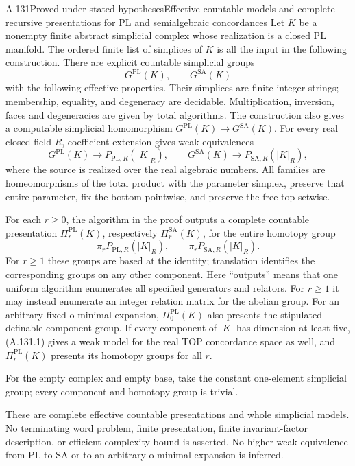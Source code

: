 \begin{saresult}{A.131}{Proved under stated hypotheses}{Effective countable models and complete recursive presentations for PL and semialgebraic concordances}
Let $K$ be a nonempty finite abstract simplicial complex whose realization
is a closed PL manifold. The ordered finite list of simplices of $K$ is
all the input in the following construction. There are explicit
countable simplicial groups
\[
 G^{\mathrm{PL}}(K),\qquad G^{\mathrm{SA}}(K)
                                                        \tag{A.131.1}
\]
with the following effective properties. Their simplices are finite
integer strings; membership, equality, and degeneracy are decidable.
Multiplication, inversion, faces and degeneracies are given by total
algorithms. The construction also gives a computable simplicial
homomorphism $G^{\mathrm{PL}}(K)\to G^{\mathrm{SA}}(K)$.
For every real closed field $R$, coefficient extension gives weak
equivalences
\[
 G^{\mathrm{PL}}(K)\longrightarrow P_{\mathrm{PL},R}(|K|_R),
 \qquad
 G^{\mathrm{SA}}(K)\longrightarrow P_{\mathrm{SA},R}(|K|_R),
                                                        \tag{A.131.2}
\]
where the source is realized over the real algebraic numbers.
All families are homeomorphisms of the total product with the
parameter simplex, preserve that entire parameter, fix the bottom
pointwise, and preserve the free top setwise.

For each $r\ge0$, the algorithm in the proof outputs a complete
countable presentation $\Pi_r^{\mathrm{PL}}(K)$, respectively
$\Pi_r^{\mathrm{SA}}(K)$, for the entire homotopy group
\[
 \pi_rP_{\mathrm{PL},R}(|K|_R),\qquad
 \pi_rP_{\mathrm{SA},R}(|K|_R).
                                                        \tag{A.131.3}
\]
For $r\ge1$ these groups are based at the identity; translation
identifies the corresponding groups on any other component.
Here ``outputs'' means that one uniform algorithm enumerates all
specified generators and relators. For $r\ge1$ it may instead
enumerate an integer relation matrix for the abelian group.
For an arbitrary fixed o-minimal expansion, $\Pi_0^{\mathrm{PL}}(K)$
also presents the stipulated definable component group. If every
component of $|K|$ has dimension at least five, (A.131.1) gives a
weak model for the real TOP concordance space as well, and
$\Pi_r^{\mathrm{PL}}(K)$ presents its homotopy groups for all $r$.

For the empty complex and empty base, take the constant one-element
simplicial group; every component and homotopy group is trivial.

These are complete effective countable presentations and whole
simplicial models. No terminating word problem, finite presentation,
finite invariant-factor description, or efficient complexity bound
is asserted. No higher weak equivalence from PL to SA or to an
arbitrary o-minimal expansion is inferred.
\end{saresult}
